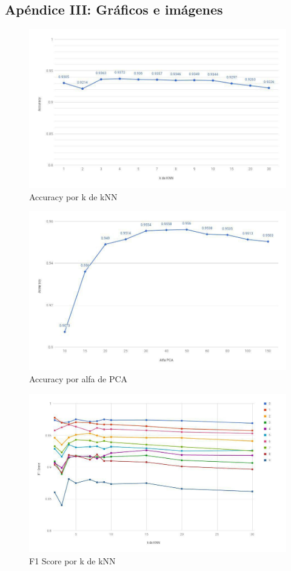 \subsection{Apéndice III: Gráficos e imágenes}

\begin{figure}[H]
    \begin{center}
      \includegraphics[width=0.8\columnwidth]{imagenes/knn-accuracy.jpg}
      \caption{Accuracy por k de kNN}
    \end{center}
\end{figure}

\begin{figure}[H]
    \begin{center}
      \includegraphics[width=0.8\columnwidth]{imagenes/pca-accuracy.jpg}
      \caption{Accuracy por alfa de PCA}
    \end{center}
\end{figure}

\begin{figure}[H]
    \begin{center}
      \includegraphics[width=0.8\columnwidth]{imagenes/knn-f1.jpg}
      \caption{F1 Score por k de kNN}
    \end{center}
\end{figure}

